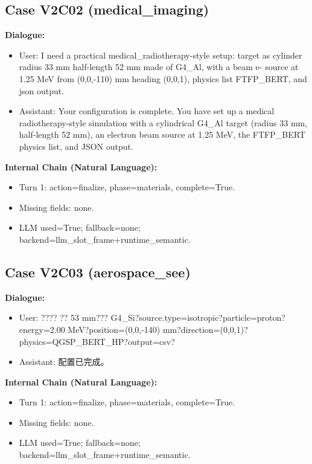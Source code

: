 \documentclass[11pt]{ctexart}
\begin{document}
\subsection{Case V2C02 (medical\_imaging)}
\textbf{Dialogue:}
\begin{itemize}
\item User: I need a practical medical\_radiotherapy-style setup: target as cylinder radius 33 mm half-length 52 mm made of G4\_Al, with a beam e- source at 1.25 MeV from (0,0,-110) mm heading (0,0,1), physics list FTFP\_BERT, and json output.
\item Assistant: Your configuration is complete. You have set up a medical radiotherapy-style simulation with a cylindrical G4\_Al target (radius 33 mm, half-length 52 mm), an electron beam source at 1.25 MeV, the FTFP\_BERT physics list, and JSON output.
\end{itemize}
\textbf{Internal Chain (Natural Language):}
\begin{itemize}
\item Turn 1: action=finalize, phase=materials, complete=True.
\item Missing fields: none.
\item LLM used=True; fallback=none; backend=llm\_slot\_frame+runtime\_semantic.
\end{itemize}
\subsection{Case V2C03 (aerospace\_see)}
\textbf{Dialogue:}
\begin{itemize}
\item User: ???? ?? 53 mm??? G4\_Si?source.type=isotropic?particle=proton?energy=2.00 MeV?position=(0,0,-140) mm?direction=(0,0,1)?physics=QGSP\_BERT\_HP?output=csv?
\item Assistant: 配置已完成。
\end{itemize}
\textbf{Internal Chain (Natural Language):}
\begin{itemize}
\item Turn 1: action=finalize, phase=materials, complete=True.
\item Missing fields: none.
\item LLM used=True; fallback=none; backend=llm\_slot\_frame+runtime\_semantic.
\end{itemize}
\end{document}
